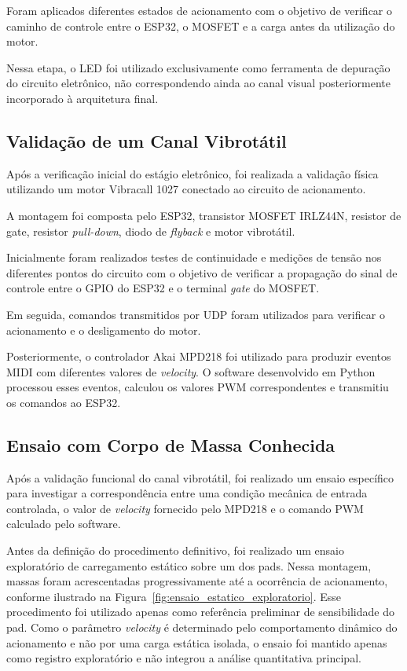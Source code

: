 Foram aplicados diferentes estados de acionamento com o objetivo de verificar o caminho de controle entre o ESP32, o MOSFET e a carga antes da utilização do motor.

Nessa etapa, o LED foi utilizado exclusivamente como ferramenta de depuração do circuito eletrônico, não correspondendo ainda ao canal visual posteriormente incorporado à arquitetura final.


\subsection{Validação de um Canal Vibrotátil}
\label{sec:validacao_um_canal}

Após a verificação inicial do estágio eletrônico, foi realizada a validação física utilizando um motor Vibracall 1027 conectado ao circuito de acionamento.

A montagem foi composta pelo ESP32, transistor MOSFET IRLZ44N, resistor de gate, resistor \textit{pull-down}, diodo de \textit{flyback} e motor vibrotátil.

Inicialmente foram realizados testes de continuidade e medições de tensão nos diferentes pontos do circuito com o objetivo de verificar a propagação do sinal de controle entre o GPIO do ESP32 e o terminal \textit{gate} do MOSFET.

Em seguida, comandos transmitidos por UDP foram utilizados para verificar o acionamento e o desligamento do motor.

Posteriormente, o controlador Akai MPD218 foi utilizado para produzir eventos MIDI com diferentes valores de \textit{velocity}. O software desenvolvido em Python processou esses eventos, calculou os valores PWM correspondentes e transmitiu os comandos ao ESP32.


\subsection{Ensaio com Corpo de Massa Conhecida}
\label{sec:ensaio_queda_controlada}

Após a validação funcional do canal vibrotátil, foi realizado um ensaio específico para investigar a correspondência entre uma condição mecânica de entrada controlada, o valor de \textit{velocity} fornecido pelo MPD218 e o comando PWM calculado pelo software.

Antes da definição do procedimento definitivo, foi realizado um ensaio exploratório de carregamento estático sobre um dos pads. Nessa montagem, massas foram acrescentadas progressivamente até a ocorrência de acionamento, conforme ilustrado na Figura~\ref{fig:ensaio_estatico_exploratorio}. Esse procedimento foi utilizado apenas como referência preliminar de sensibilidade do pad. Como o parâmetro \textit{velocity} é determinado pelo comportamento dinâmico do acionamento e não por uma carga estática isolada, o ensaio foi mantido apenas como registro exploratório e não integrou a análise quantitativa principal.

